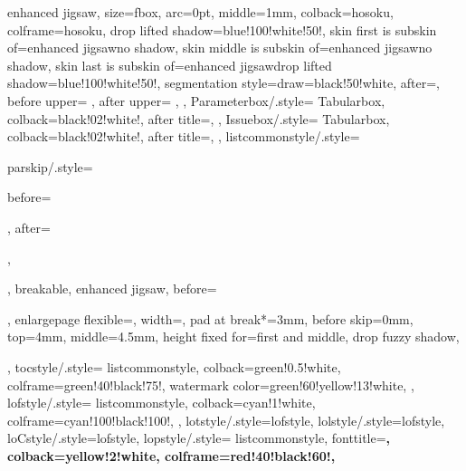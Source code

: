 {{    enhanced jigsaw,%
    size=fbox,%
    arc=0pt,%
    middle=1mm,%
    colback=hosoku,%
    colframe=hosoku,%
    drop lifted shadow={blue!100!white!50!},%
    skin first is subskin of={enhanced jigsaw}{no shadow},%
    skin middle is subskin of={enhanced jigsaw}{no shadow},%
    skin last is subskin of={enhanced jigsaw}{drop lifted shadow={blue!100!white!50!}},%
    segmentation style={draw=black!50!white},%
    after=\smallskip\noindent{\color{white}},%
    before upper={%
      \tcbtitle%
      \setcounter{GlobalFootnote}{\value{footnote}}%
      \let\oldfootnote=\footnote%
      \def\footnote{\stepcounter{GlobalFootnote}\oldfootnote[\arabic{GlobalFootnote}]}%
      \renewcommand\thempfootnote{\arabic{mpfootnote}}%
    },
    after upper={%
      \setcounter{footnote}{\value{GlobalFootnote}}%
      \let\footnote=\oldfootnote%
    },
  },
  Parameterbox/.style={%
    Tabularbox,
    colback=black!02!white!,%
    after title=\hfill\termblue{\parametername},%
  },%
  Issuebox/.style={%
    Tabularbox,
    colback=black!02!white!,%
    after title=\hfill\termblue{\issuename},%
  },%
  listcommonstyle/.style={%
    parskip/.style={
        before={\par\pagebreak[0]\parindent=0pt},
        after={\parfillskip=0pt\par},
    },
    breakable,%
    enhanced jigsaw,%
    before=\par\bigskip\noindent,%
    enlargepage flexible=\baselineskip,%
    width=\textwidth,
    pad at break*=3mm,%
    before skip=0mm,%
    top=4mm,%
    middle=4.5mm,
    height fixed for=first and middle,%
    drop fuzzy shadow,
  },
  tocstyle/.style={%
    listcommonstyle,
    colback=green!0.5!white,%
    colframe=green!40!black!75!,%
    watermark color=green!60!yellow!13!white,%
  },
  lofstyle/.style={%
    listcommonstyle,
    colback=cyan!1!white,%
    colframe=cyan!100!black!100!,%
  },
  lotstyle/.style={lofstyle},
  lolstyle/.style={lofstyle},
  loCstyle/.style={lofstyle},
  lopstyle/.style={%
    listcommonstyle,
    fonttitle=\sffamily\bfseries\large,%
    colback=yellow!2!white,%
    colframe=red!40!black!60!,%
}}
